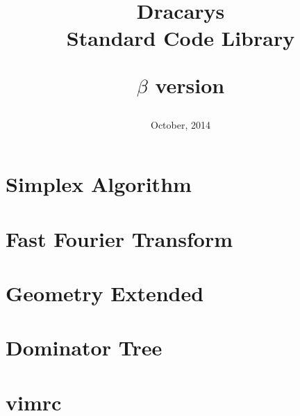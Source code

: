\documentclass[landscape,a4paper,10pt,twocolumn]{article}
\title{\Large{Dracarys} \\ [2ex] \LARGE{Standard Code Library} \\[2ex] \begin{normalsize} $\beta$ version \end{normalsize}}
\date{October, 2014}
\begin{document}
\maketitle

\tableofcontents

\newpage

\newpage
	\section{Simplex Algorithm}
		

\newpage
	\section{Fast Fourier Transform}
		

\newpage
	\section{Geometry Extended}
		

\newpage
	\section{Dominator Tree}
		

\newpage
	\section{vimrc}
		
\end{document}
